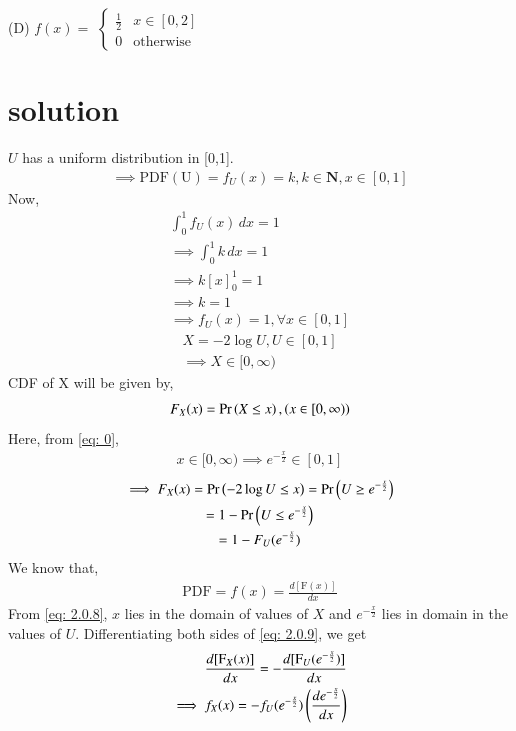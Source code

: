 \documentclass[journal,12pt,twocolumn]{IEEEtran}
\begin{document}
(D) $f(x)=$
$\begin{cases}
\frac{1}{2} & x\in [0,2]\\
0 & \mathrm{otherwise}
\end{cases}$
\section{solution}
$U$ has a uniform distribution in [0,1].
\begin{align}
    \implies \mathrm{PDF(U)}=f_U(x)=k, k\in\textbf{N}, x\in[0,1]
\end{align}
Now,
\begin{align}
    \int_{0}^1 f_U(x)\,dx=1\\
    \implies \int_0^1 k\,dx=1\\
    \implies k[x]_0^1=1\\
    \implies k=1\\
    \implies f_U(x)=1, \forall x\in[0,1]\label{2.0.6}
\end{align}
\begin{align}
    X=-2\log{U},U\in[0,1]\\
    \implies X\in[0,\infty)\label{eq: 0}
\end{align}
CDF of X will be given by,
\begin{align}
F_{X}(x) = \Pr\left(X\leq x\right),  \left(x\in[0,\infty)\right)\\
\end{align}
Here, from \eqref{eq: 0},
\begin{align}
x\in[0,\infty)
    \implies e^{-\frac{x}{2}}\in [0,1]\label{eq: 2.0.8}
\end{align}
\begin{multline}
    \implies F_X(x)  =\Pr\left(-2\log U\leq x\right) 
    =\Pr\left(U\geq e^{-\frac{x}{2}}\right)\\
    =1-\Pr\left(U\leq e^{-\frac{x}{2}}\right)\\
    =1-F_{U}(e^{-\frac{x}{2}})\label{eq: 2.0.9}
    \end{multline}
We know that,
\begin{align}
    \mathrm{PDF}=f(x)=\frac{d[\mathrm{F}(x)]}{dx}
\end{align}
From \eqref{eq: 2.0.8}, $x$ lies in the domain of values of $X$ and $e^{-\frac{x}{2}}$ lies in domain in the values of $U$. Differentiating both sides of \eqref{eq: 2.0.9}, we get
\begin{align}
    \frac{d[\mathrm{F}_X(x)]}{dx}=-\frac{d[\mathrm{F}_U(e^{-\frac{x}{2}})]}{dx}\label{eq: 2.0.3}\\
    \implies f_{X}(x)=-f_{U}(e^{-\frac{x}{2}})\left(\frac{de^{-\frac{x}{2}}}{dx}\right)
    \end{align}
\end{document}
